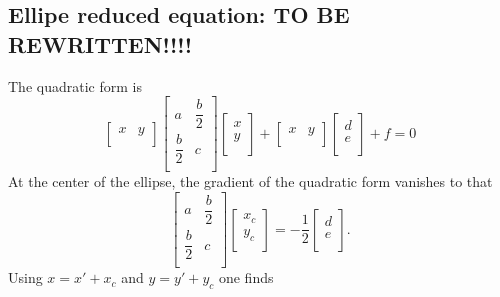 \documentclass[aps]{revtex4}
\begin{document}
\subsection{Ellipe reduced equation: TO BE REWRITTEN!!!!}
The quadratic  form is
\begin{equation}
\begin{bmatrix}
x & y\\
\end{bmatrix}
\begin{bmatrix}
 a & \dfrac{b}{2} \\
 \dfrac{b}{2} & c\\
\end{bmatrix}
	\begin{bmatrix}
	x\\
	y\\
	\end{bmatrix}
	+
	\begin{bmatrix}
	x & y\\
	\end{bmatrix}
	\begin{bmatrix}
	d\\
	e\\
	\end{bmatrix}
	+f = 0
\end{equation}
At the center of the ellipse, the gradient of the quadratic form vanishes to that
\begin{equation}
	\begin{bmatrix}
 a & \dfrac{b}{2} \\
 \dfrac{b}{2} & c\\
\end{bmatrix}
\begin{bmatrix}
	x_c\\
	y_c\\
\end{bmatrix}
= -\dfrac{1}{2} 
\begin{bmatrix}
	d\\
	e\\
	\end{bmatrix}.
\end{equation}
Using $x=x'+x_c$ and $y=y'+y_c$
one finds
\end{document}
